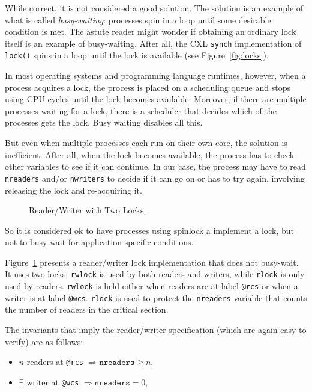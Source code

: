 \documentclass{report}
\newenvironment{code}{
\tcolorbox
}{
\endtcolorbox
}
\begin{document}
While correct, it is not considered a good solution.
The solution is an example of what is called \emph{busy-waiting}:
processes spin in a loop until some desirable condition is met.
The astute reader might wonder if obtaining an ordinary lock itself is an
example of busy-waiting.  After all, the CXL \texttt{synch} implementation
of \texttt{lock()} spins in a loop until the lock is available
(see Figure~\ref{fig:locks}).

In most operating systems and programming language runtimes, however,
when a process acquires a lock, the process is placed on a scheduling
queue and stops using CPU cycles until the lock becomes available.
Moreover, if there are multiple processes waiting for a lock, there
is a scheduler that decides which of the processes gets the lock.
Busy waiting disables all this.

But even when multiple processes each run on their own core, the solution
is inefficient.  After all, when the lock becomes available, the process
has to check other variables to see if it can continue.  In our case,
the process may have to read \texttt{nreaders} and/or \texttt{nwriters}
to decide if it can go on or has to try again, involving releasing
the lock and re-acquiring it.

\begin{figure}
\begin{code}

\end{code}
\caption{Reader/Writer with Two Locks.}
\label{fig:rw2lock}
\end{figure}

So it is considered ok to have processes using spinlock a implement a
lock, but not to busy-wait for application-specific conditions.

Figure~\ref{fig:rw2lock} presents a reader/writer lock implementation
that does not busy-wait.
It uses two locks: \texttt{rwlock} is used by both readers and writers,
while \texttt{rlock} is only used by readers.
\texttt{rwlock} is held either when readers are at label \texttt{@rcs}
or when a writer is at label \texttt{@wcs}.
\texttt{rlock} is used to protect the \texttt{nreaders} variable that
counts the number of readers in the critical section. 

The invariants that imply the reader/writer specification
(which are again easy to verify) are as follows:

\begin{itemize}
\item $n$ readers at \texttt{@rcs} $\Rightarrow \mathtt{nreaders} \ge n$,
\item $\exists$ writer at \texttt{@wcs} $\Rightarrow \mathtt{nreaders} = 0$,
\end{itemize}
\end{document}
